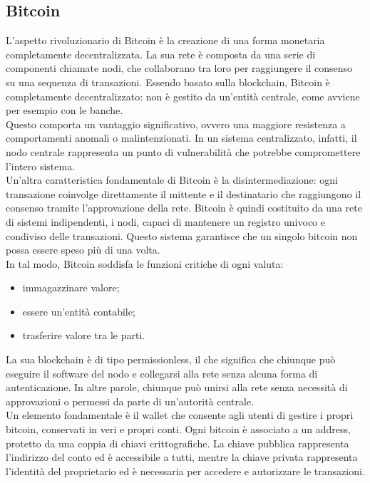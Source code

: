 \subsection{Bitcoin}

L’aspetto rivoluzionario di Bitcoin è la creazione di una forma monetaria completamente decentralizzata. La sua rete è composta da una serie di componenti chiamate nodi, che collaborano tra loro per raggiungere il consenso su una sequenza di transazioni.
Essendo basato sulla blockchain, Bitcoin è completamente decentralizzato: non è gestito da un’entità centrale, come avviene per esempio con le banche. 
\\Questo comporta un vantaggio significativo, ovvero una maggiore resistenza a comportamenti anomali o malintenzionati. In un sistema centralizzato, infatti, il nodo centrale rappresenta un punto di vulnerabilità che potrebbe compromettere l’intero sistema.
\\Un’altra caratteristica fondamentale di Bitcoin è la disintermediazione: ogni transazione coinvolge direttamente il mittente e il destinatario che raggiungono il consenso tramite l’approvazione della rete. Bitcoin è quindi costituito da una rete di sistemi indipendenti, i nodi, capaci di mantenere un registro univoco e condiviso delle transazioni. Questo sistema garantisce che un singolo bitcoin non possa essere speso più di una volta.\\
In tal modo, Bitcoin soddisfa le funzioni critiche di ogni valuta:
\begin{itemize}
\item immagazzinare valore;
\item essere un’entità contabile;
\item trasferire valore tra le parti.
\end{itemize}
La sua blockchain è di tipo permissionless, il che significa che chiunque può eseguire il software del nodo e collegarsi alla rete senza alcuna forma di autenticazione. In altre parole, chiunque può unirsi alla rete senza necessità di approvazioni o permessi da parte di un’autorità centrale.
\\Un elemento fondamentale è il wallet che consente agli utenti di gestire i propri bitcoin, conservati in veri e propri conti. Ogni bitcoin è associato a un address, protetto da una coppia di chiavi crittografiche.
La chiave pubblica rappresenta l’indirizzo del conto ed è accessibile a tutti, mentre la chiave privata rappresenta l’identità del proprietario ed è necessaria per accedere e autorizzare le transazioni.
